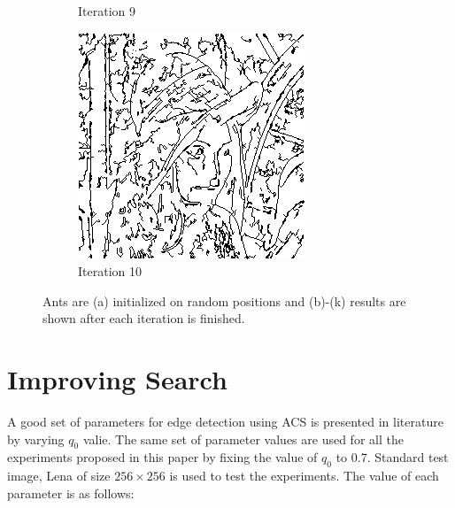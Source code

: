 \documentclass{llncs}
\begin{document}
\begin{figure}
\begin{subfigure}[b]{0.3\textwidth}
                \caption{Iteration 9}
                \label{fig:rand_iter9}
        \end{subfigure}
        \quad
        \begin{subfigure}[b]{0.3\textwidth}
                \includegraphics[width=\textwidth]{IMG/RandomInit/Iteration10}
                \caption{Iteration 10}
                \label{fig:rand_iter10}
        \end{subfigure}
        \caption{Ants are (a) initialized on random positions and (b)-(k) results are shown after each iteration is finished.}\label{fig:rand_init_approach}
	\end{figure}
	
	\section{Improving Search} \label{sec:imp_search}
	A good set of parameters for edge detection using ACS is presented in literature \cite{Anna:2010} by varying $q_0$ valie. The same set of parameter values are used for all the experiments proposed in this paper by fixing the value of $q_0$ to 0.7. Standard test image, Lena of size $256\times256$ is used to test the experiments. The value of each parameter is as follows:
	
\end{document}
